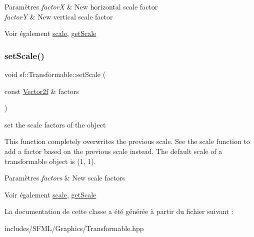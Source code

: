 \begin{DoxyParams}{Paramètres}
{\em factorX} & New horizontal scale factor \\
\hline
{\em factorY} & New vertical scale factor\\
\hline
\end{DoxyParams}
\begin{DoxySeeAlso}{Voir également}
\hyperlink{classsf_1_1Transformable_a3de0c6d8957f3cf318092f3f60656391}{scale}, \hyperlink{classsf_1_1Transformable_a73819fdea80ca8a06fad8a0067b4588c}{get\+Scale} 
\end{DoxySeeAlso}
\mbox{\label{classsf_1_1Transformable_a4c48a87f1626047e448f9c1a68ff167e}} 
\subsubsection{\texorpdfstring{set\+Scale()}{setScale()}\hspace{0.1cm}{\footnotesize\ttfamily [2/2]}}
{\footnotesize\ttfamily void sf\+::\+Transformable\+::set\+Scale (\begin{DoxyParamCaption}\item[{const \hyperlink{classsf_1_1Vector2}{Vector2f} \&}]{factors }\end{DoxyParamCaption})}



set the scale factors of the object 

This function completely overwrites the previous scale. See the scale function to add a factor based on the previous scale instead. The default scale of a transformable object is (1, 1).


\begin{DoxyParams}{Paramètres}
{\em factors} & New scale factors\\
\hline
\end{DoxyParams}
\begin{DoxySeeAlso}{Voir également}
\hyperlink{classsf_1_1Transformable_a3de0c6d8957f3cf318092f3f60656391}{scale}, \hyperlink{classsf_1_1Transformable_a73819fdea80ca8a06fad8a0067b4588c}{get\+Scale} 
\end{DoxySeeAlso}


La documentation de cette classe a été générée à partir du fichier suivant \+:\begin{DoxyCompactItemize}
\item 
includes/\+S\+F\+M\+L/\+Graphics/Transformable.\+hpp\end{DoxyCompactItemize}
